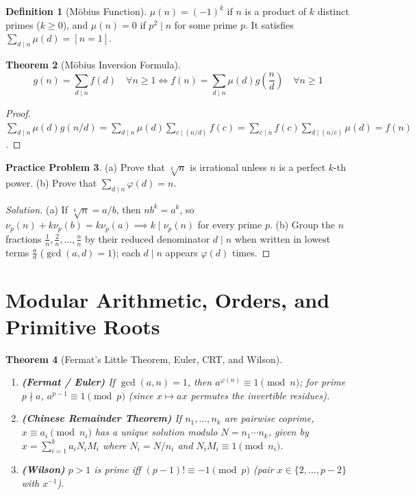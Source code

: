 \documentclass[11pt]{article}
\theoremstyle{plain}
\newtheorem{theorem}{Theorem}[section]
\theoremstyle{definition}
\newtheorem{definition}[theorem]{Definition}
\newtheorem{problem}[theorem]{Practice Problem}
\newenvironment{solution}{\begin{proof}[Solution]}{\end{proof}}
\begin{document}
\begin{definition}[Möbius Function]
$\mu(n) = (-1)^k$ if $n$ is a product of $k$ distinct primes ($k\ge 0$), and $\mu(n) = 0$ if $p^2 \mid n$ for some prime $p$. It satisfies $\sum_{d\mid n}\mu(d) = [n=1]$.
\end{definition}

\begin{theorem}[Möbius Inversion Formula]
$$g(n) = \sum_{d \mid n} f(d) \quad\forall n \ge 1 \iff f(n) = \sum_{d \mid n} \mu(d) g\left(\frac{n}{d}\right) \quad\forall n \ge 1$$
\end{theorem}
\begin{proof}
$\sum_{d\mid n}\mu(d)g(n/d) = \sum_{d\mid n}\mu(d)\sum_{c\mid (n/d)}f(c) = \sum_{c\mid n}f(c)\sum_{d\mid (n/c)}\mu(d) = f(n)$.
\end{proof}

\begin{problem}
(a) Prove that $\sqrt[k]{n}$ is irrational unless $n$ is a perfect $k$-th power.
(b) Prove that $\sum_{d \mid n}\varphi(d) = n$.
\end{problem}
\begin{solution}
(a) If $\sqrt[k]{n} = a/b$, then $nb^k = a^k$, so $\nu_p(n) + k\nu_p(b) = k\nu_p(a) \implies k \mid \nu_p(n)$ for every prime $p$.
(b) Group the $n$ fractions $\frac{1}{n}, \frac{2}{n}, \dots, \frac{n}{n}$ by their reduced denominator $d \mid n$ when written in lowest terms $\frac{a}{d}$ ($\gcd(a,d)=1$); each $d \mid n$ appears $\varphi(d)$ times.
\end{solution}

\section{Modular Arithmetic, Orders, and Primitive Roots}

\begin{theorem}[Fermat's Little Theorem, Euler, CRT, and Wilson]
\leavevmode
\begin{enumerate}[label=(\alph*)]
\item \textbf{(Fermat / Euler)} If $\gcd(a,n)=1$, then $a^{\varphi(n)} \equiv 1 \pmod n$; for prime $p \nmid a$, $a^{p-1} \equiv 1 \pmod p$ (since $x \mapsto ax$ permutes the invertible residues).
\item \textbf{(Chinese Remainder Theorem)} If $n_1,\dots,n_k$ are pairwise coprime, $x \equiv a_i \pmod{n_i}$ has a unique solution modulo $N = n_1\cdots n_k$, given by $x = \sum_{i=1}^k a_i N_i M_i$ where $N_i = N/n_i$ and $N_i M_i \equiv 1 \pmod{n_i}$.
\item \textbf{(Wilson)} $p > 1$ is prime iff $(p-1)! \equiv -1 \pmod p$ (pair $x \in \{2,\dots,p-2\}$ with $x^{-1}$).
\end{enumerate}
\end{theorem}
\end{document}
